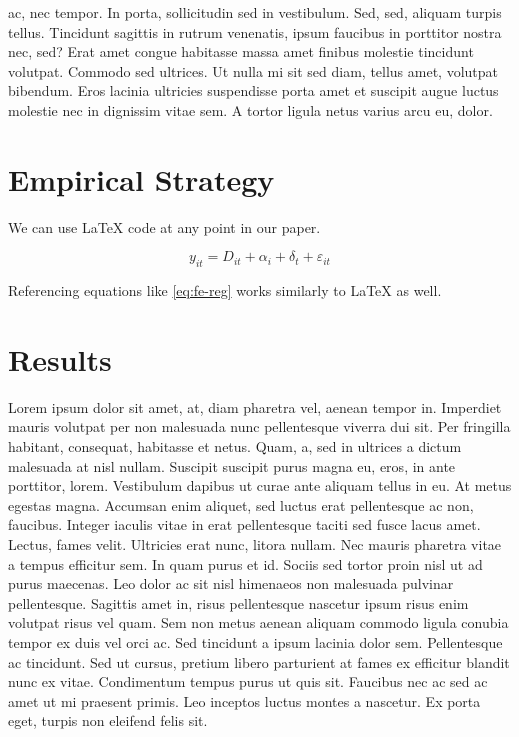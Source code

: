 \documentclass[
  12pt,
]{article}
\begin{document}
ac, nec tempor. In porta, sollicitudin sed in vestibulum. Sed, sed, aliquam turpis tellus. Tincidunt sagittis in rutrum venenatis, ipsum faucibus in porttitor nostra nec, sed? Erat amet congue habitasse massa amet finibus molestie tincidunt volutpat. Commodo sed ultrices. Ut nulla mi sit sed diam, tellus amet, volutpat bibendum. Eros lacinia ultricies suspendisse porta amet et suscipit augue luctus molestie nec in dignissim vitae sem. A tortor ligula netus varius arcu eu, dolor.

\hypertarget{strat}{%
\section{Empirical Strategy}\label{strat}}

We can use LaTeX code at any point in our paper.

\begin{equation}
y_{it} = D_{it} + \alpha_i + \delta_t + \varepsilon_{it} \label{eq:fe-reg}
\end{equation}

Referencing equations like \eqref{eq:fe-reg} works similarly to LaTeX as well.

\hypertarget{res}{%
\section{Results}\label{res}}

Lorem ipsum dolor sit amet, at, diam pharetra vel, aenean tempor in. Imperdiet mauris volutpat per non malesuada nunc pellentesque viverra dui sit. Per fringilla habitant, consequat, habitasse et netus. Quam, a, sed in ultrices a dictum malesuada at nisl nullam. Suscipit suscipit purus magna eu, eros, in ante porttitor, lorem. Vestibulum dapibus ut curae ante aliquam tellus in eu. At metus egestas magna. Accumsan enim aliquet, sed luctus erat pellentesque ac non, faucibus. Integer iaculis vitae in erat pellentesque taciti sed fusce lacus amet. Lectus, fames velit. Ultricies erat nunc, litora nullam. Nec mauris pharetra vitae a tempus efficitur sem. In quam purus et id. Sociis sed tortor proin nisl ut ad purus maecenas. Leo dolor ac sit nisl himenaeos non malesuada pulvinar pellentesque. Sagittis amet in, risus pellentesque nascetur ipsum risus enim volutpat risus vel quam. Sem non metus aenean aliquam commodo ligula conubia tempor ex duis vel orci ac. Sed tincidunt a ipsum lacinia dolor sem. Pellentesque ac tincidunt. Sed ut cursus, pretium libero parturient at fames ex efficitur blandit nunc ex vitae. Condimentum tempus purus ut quis sit. Faucibus nec ac sed ac amet ut mi praesent primis. Leo inceptos luctus montes a nascetur. Ex porta eget, turpis non eleifend felis sit.
\end{document}
